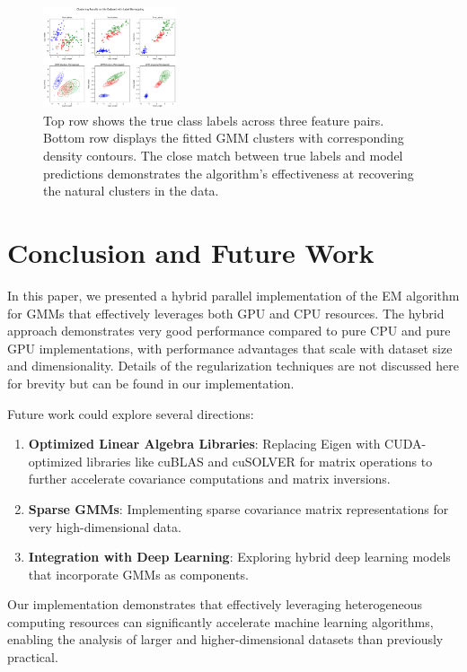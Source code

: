 \documentclass[conference]{IEEEtran}
\begin{document}
\begin{figure}[h!]
    \centering
    \includegraphics[width=0.35\textwidth]{iris1.png}
    \caption{Top row shows the true class labels across three feature pairs. Bottom row displays the fitted GMM clusters with corresponding density contours. The close match between true labels and model predictions demonstrates the algorithm's effectiveness at recovering the natural clusters in the data.}
    \label{fig:iris_results}
\end{figure}

\section{Conclusion and Future Work}
\label{conclusion}

In this paper, we presented a hybrid parallel implementation of the EM algorithm for GMMs that effectively leverages both GPU and CPU resources. The hybrid approach demonstrates very good performance compared to pure CPU and pure GPU implementations, with performance advantages that scale with dataset size and dimensionality. Details of the regularization techniques are not discussed here for brevity but can be found in our implementation.

Future work could explore several directions:
\begin{enumerate}
    \item \textbf{Optimized Linear Algebra Libraries}: Replacing Eigen with CUDA-optimized libraries like cuBLAS and cuSOLVER for matrix operations to further accelerate covariance computations and matrix inversions.
    
    \item \textbf{Sparse GMMs}: Implementing sparse covariance matrix representations for very high-dimensional data.
    
    \item \textbf{Integration with Deep Learning}: Exploring hybrid deep learning models that incorporate GMMs as components.
\end{enumerate}

Our implementation demonstrates that effectively leveraging heterogeneous computing resources can significantly accelerate machine learning algorithms, enabling the analysis of larger and higher-dimensional datasets than previously practical.
\end{document}
